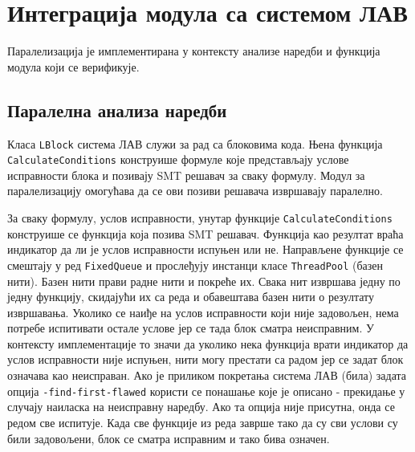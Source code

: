 \documentclass[12pt,oneside]{memoir}
\begin{document}
\section{Интеграција модула са системом ЛАВ}

Паралелизација је имплементирана у контексту анализе наредби и функција модула који се верификује. 

\subsection{Паралелна анализа наредби}

Класа \texttt{LBlock} система ЛАВ служи за рад са блоковима кода. Њена функција \texttt{CalculateConditions} конструише формуле које представљају услове исправности блока и позивају SMT решавач за сваку формулу. Модул за паралелизацију омогућава да се ови позиви решавача извршавају паралелно.

 За сваку формулу, услов исправности, унутар функције \texttt{CalculateConditions} конструише се функција која позива SMT решавач. Функција као резултат враћа индикатор да ли је услов исправности испуњен или не. Направљене функције се смештају у ред \texttt{FixedQueue} и прослеђују инстанци класе \texttt{ThreadPool} (базен нити). Базен нити прави радне нити и покреће их. Свака нит извршава једну по једну функцију, скидајући их са реда и обавештава базен нити о резултату извршавања. Уколико се наиђе на услов исправности који није задовољен, нема потребе испитивати остале услове јер се тада блок сматра неисправним. У контексту имплементације то значи да уколико нека функција врати индикатор да услов исправности није испуњен, нити могу престати са радом јер се задат блок означава као неисправан. Ако је приликом покретања система ЛАВ (била) задата опција \texttt{-find-first-flawed} користи се понашање које је описано - прекидање у случају наиласка на неисправну наредбу. Ако та опција није присутна, онда се редом све испитује. Када све функције из реда заврше тако да су сви услови су били задовољени, блок се сматра исправним и тако бива означен. 
 
\end{document}
